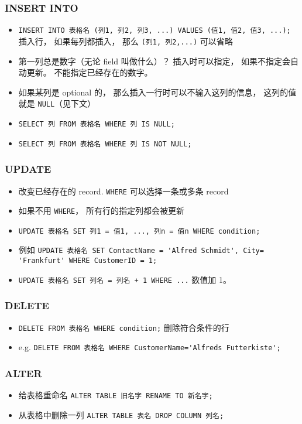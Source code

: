 \subsubsection{INSERT INTO}
\begin{itemize}
\item \verb`INSERT INTO 表格名 (列1, 列2, 列3, ...) VALUES (值1, 值2, 值3, ...);` 插入行， 如果每列都插入， 那么 \verb`(列1, 列2,...)` 可以省略
\item 第一列总是数字（无论 field 叫做什么）？ 插入时可以指定，  如果不指定会自动更新。 不能指定已经存在的数字。
\item 如果某列是 optional 的， 那么插入一行时可以不输入这列的信息， 这列的值就是 \verb`NULL`（见下文）
\item \verb`SELECT 列 FROM 表格名 WHERE 列 IS NULL;`
\item \verb`SELECT 列 FROM 表格名 WHERE 列 IS NOT NULL;`
\end{itemize}

\subsubsection{UPDATE}
\begin{itemize}
\item 改变已经存在的 record. \verb|WHERE| 可以选择一条或多条 record
\item 如果不用 \verb`WHERE`， 所有行的指定列都会被更新
\item \verb`UPDATE 表格名 SET 列1 = 值1, ..., 列n = 值n WHERE condition;`
\item 例如 \verb`UPDATE 表格名 SET ContactName = 'Alfred Schmidt', City= 'Frankfurt' WHERE CustomerID = 1;`
\item \verb|UPDATE 表格名 SET 列名 = 列名 + 1 WHERE ...| 数值加 1。
\end{itemize}

\subsubsection{DELETE}
\begin{itemize}
\item \verb`DELETE FROM 表格名 WHERE condition;` 删除符合条件的行
\item e.g. \verb`DELETE FROM 表格名 WHERE CustomerName='Alfreds Futterkiste';`
\end{itemize}

\subsubsection{ALTER}
\begin{itemize}
\item 给表格重命名 \verb|ALTER TABLE 旧名字 RENAME TO 新名字;|
\item 从表格中删除一列 \verb|ALTER TABLE 表名 DROP COLUMN 列名;|
\end{itemize}

